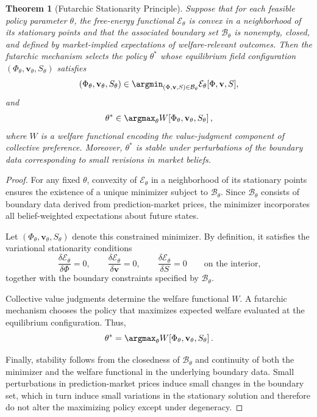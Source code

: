 \documentclass[12pt]{article}
\newtheorem{theorem}{Theorem}
\begin{document}
\begin{theorem}[Futarchic Stationarity Principle]
Suppose that for each feasible policy parameter \(\theta\), the free-energy
functional \(\mathcal{E}_\theta\) is convex in a neighborhood of its stationary
points and that the associated boundary set \(\mathcal{B}_\theta\) is
nonempty, closed, and defined by market-implied expectations of
welfare-relevant outcomes.  Then the futarchic mechanism selects the policy
\(\theta^\ast\) whose equilibrium field configuration
\((\Phi_\theta,\mathbf{v}_\theta,S_\theta)\) satisfies
\[
(\Phi_\theta,\mathbf{v}_\theta,S_\theta)
\in \argmin_{(\Phi,\mathbf{v},S)\in \mathcal{B}_\theta}
\mathcal{E}_\theta[\Phi,\mathbf{v},S],
\]
and
\[
\theta^\ast
\in \argmax_{\theta}
W\!\left[\Phi_\theta,\mathbf{v}_\theta,S_\theta\right],
\]
where \(W\) is a welfare functional encoding the value-judgment component of
collective preference.  Moreover, \(\theta^\ast\) is stable under perturbations
of the boundary data corresponding to small revisions in market beliefs.
\end{theorem}

\begin{proof}
For any fixed \(\theta\), convexity of \(\mathcal{E}_\theta\) in a neighborhood
of its stationary points ensures the existence of a unique minimizer subject to
\(\mathcal{B}_\theta\).  Since \(\mathcal{B}_\theta\) consists of boundary data
derived from prediction-market prices, the minimizer incorporates all
belief-weighted expectations about future states.

Let \((\Phi_\theta,\mathbf{v}_\theta,S_\theta)\) denote this constrained
minimizer.  By definition, it satisfies the variational stationarity conditions
\[
\frac{\delta \mathcal{E}_\theta}{\delta \Phi} = 0,
\qquad
\frac{\delta \mathcal{E}_\theta}{\delta \mathbf{v}} = 0,
\qquad
\frac{\delta \mathcal{E}_\theta}{\delta S} = 0
\qquad
\text{on the interior,}
\]
together with the boundary constraints specified by \(\mathcal{B}_\theta\).

Collective value judgments determine the welfare functional \(W\).  A
futarchic mechanism chooses the policy that maximizes expected welfare
evaluated at the equilibrium configuration.  Thus,
\[
\theta^\ast
= \argmax_\theta W\!\left[\Phi_\theta,\mathbf{v}_\theta,S_\theta\right].
\]

Finally, stability follows from the closedness of \(\mathcal{B}_\theta\) and
continuity of both the minimizer and the welfare functional in the underlying
boundary data.  Small perturbations in prediction-market prices induce small
changes in the boundary set, which in turn induce small variations in the
stationary solution and therefore do not alter the maximizing policy except
under degeneracy.
\end{proof}
\end{document}
